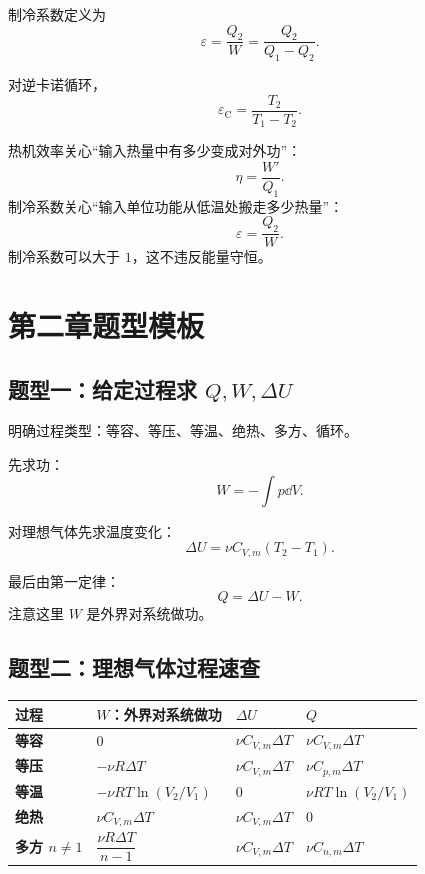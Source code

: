 制冷系数定义为
\[
  \boxed{
  \varepsilon
  =
  \frac{Q_2}{W}
  =
  \frac{Q_2}{Q_1-Q_2}
  }.
\]

对逆卡诺循环，
\[
  \boxed{
  \varepsilon_{\mathrm C}
  =
  \frac{T_2}{T_1-T_2}
  }.
\]

\begin{KeyBox}[热机效率与制冷系数的区别]
热机效率关心“输入热量中有多少变成对外功”：
\[
  \eta=\frac{W'}{Q_1}.
\]
制冷系数关心“输入单位功能从低温处搬走多少热量”：
\[
  \varepsilon=\frac{Q_2}{W}.
\]
制冷系数可以大于 \(1\)，这不违反能量守恒。
\end{KeyBox}

\section{第二章题型模板}

\subsection{题型一：给定过程求 \(Q,W,\Delta U\)}

\begin{MethodBox}[通用流程]
\begin{ReviewList}
  \item 明确过程类型：等容、等压、等温、绝热、多方、循环。
  \item 先求功：
  \[
    W=-\int p\dd V.
  \]
  \item 对理想气体先求温度变化：
  \[
    \Delta U=\nu C_{V,m}(T_2-T_1).
  \]
  \item 最后由第一定律：
  \[
    Q=\Delta U-W.
  \]
  注意这里 \(W\) 是外界对系统做功。
\end{ReviewList}
\end{MethodBox}

\subsection{题型二：理想气体过程速查}

\begin{FormulaBox}[理想气体常见过程]
\begin{tabularx}{\textwidth}{@{}>{\bfseries}lXXX@{}}
\toprule
过程 & \(W\)：外界对系统做功 & \(\Delta U\) & \(Q\)\\
\midrule
等容 & \(0\) & \(\nu C_{V,m}\Delta T\) & \(\nu C_{V,m}\Delta T\)\\[0.5em]
等压 & \(-\nu R\Delta T\) & \(\nu C_{V,m}\Delta T\) & \(\nu C_{p,m}\Delta T\)\\[0.5em]
等温 & \(-\nu RT\ln(V_2/V_1)\) & \(0\) & \(\nu RT\ln(V_2/V_1)\)\\[0.5em]
绝热 & \(\nu C_{V,m}\Delta T\) & \(\nu C_{V,m}\Delta T\) & \(0\)\\[0.5em]
多方 \(n\ne1\) & \(\dfrac{\nu R\Delta T}{n-1}\) & \(\nu C_{V,m}\Delta T\) & \(\nu C_{n,m}\Delta T\)\\
\bottomrule
\end{tabularx}
\end{FormulaBox}

